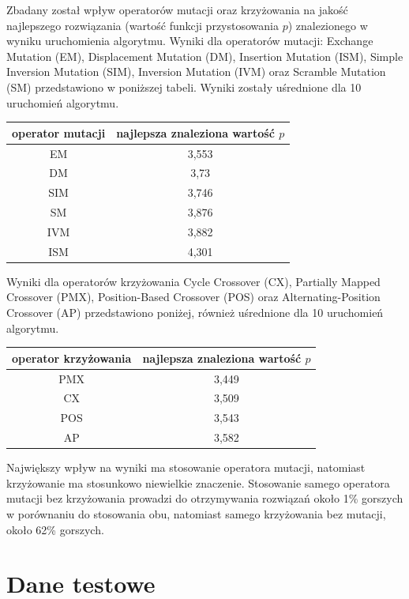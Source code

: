 \documentclass[brudnopis]{xmgr}
\begin{document}
Zbadany został wpływ operatorów mutacji oraz krzyżowania na jakość najlepszego rozwiązania (wartość funkcji przystosowania $p$) znalezionego w wyniku uruchomienia algorytmu. Wyniki dla operatorów mutacji: Exchange Mutation (EM), Displacement Mutation (DM), Insertion Mutation (ISM), Simple Inversion Mutation (SIM), Inversion Mutation (IVM) oraz Scramble Mutation (SM) przedstawiono w poniższej tabeli. Wyniki zostały uśrednione dla 10 uruchomień algorytmu.\newline\newline
\begin{tabular}{ c | c }
  operator mutacji & najlepsza znaleziona wartość $p$ \\
  \hline
  EM  & 3,553 \\
  DM  & 3,73 \\
  SIM & 3,746 \\
  SM  & 3,876 \\
  IVM & 3,882 \\
  ISM & 4,301 \\
\end{tabular}\newline

Wyniki dla operatorów krzyżowania Cycle Crossover (CX), Partially Mapped Crossover (PMX), Position-Based Crossover (POS) oraz Alternating-Position Crossover (AP) przedstawiono poniżej, również uśrednione dla 10 uruchomień algorytmu.

\begin{tabular}{ c | c }
  operator krzyżowania & najlepsza znaleziona wartość $p$ \\
  \hline
  PMX & 3,449 \\
  CX  & 3,509 \\
  POS & 3,543 \\
  AP  & 3,582 \\
\end{tabular}\newline

Największy wpływ na wyniki ma stosowanie operatora mutacji, natomiast krzyżowanie ma stosunkowo niewielkie znaczenie. Stosowanie samego operatora mutacji bez krzyżowania prowadzi do otrzymywania rozwiązań około 1\% gorszych w porównaniu do stosowania obu, natomiast samego krzyżowania bez mutacji, około 62\% gorszych.



\section{Dane testowe}
\end{document}
